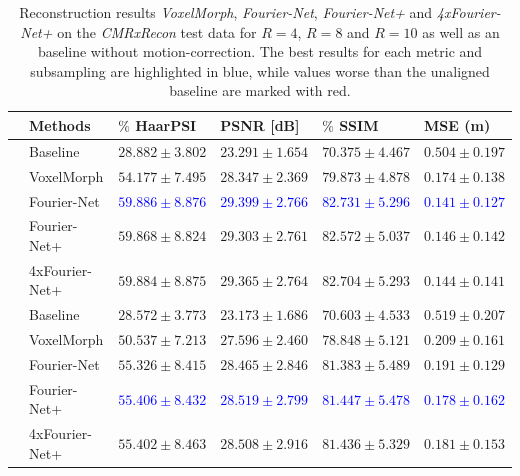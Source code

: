 \begin{table}[H] %
	\small
	\centering
	\caption{Reconstruction results \emph{VoxelMorph}, \emph{Fourier-Net}, \emph{Fourier-Net+} and \emph{4xFourier-Net+} on the \emph{CMRxRecon} test data for $R=4$, $R=8$ and $R=10$ as well as an baseline without motion-correction. The best results for each metric and subsampling are highlighted in blue, while values worse than the unaligned baseline are marked with red.}
	\label{tab:ComparisonReconstructionCMRxReconLungMovement}
	\begin{tabularx}{\textwidth}{c Y Y Y Y Y} 
		\toprule
		 & Methods & $\%$ HaarPSI & PSNR [dB] & $\%$ SSIM & MSE (m)\\
		
		\midrule
		 & Baseline & $28.882 \pm 3.802$ & $23.291 \pm 1.654$ & $70.375 \pm 4.467$ & $0.504 \pm 0.197$ \\  
		 & VoxelMorph & $54.177 \pm 7.495$ & $28.347 \pm 2.369$ & $79.873 \pm 4.878$ & $0.174 \pm 0.138$ \\ 
		 & Fourier-Net & \textcolor{blue}{$59.886 \pm 8.876$} & \textcolor{blue}{$29.399 \pm 2.766$} & \textcolor{blue}{$82.731 \pm 5.296$} & \textcolor{blue}{$0.141 \pm 0.127$} \\  
		 & Fourier-Net+ & $59.868 \pm 8.824$ & $29.303 \pm 2.761$ & $82.572 \pm 5.037$ & $0.146 \pm 0.142$  \\    
		 & \mbox{4xFourier-Net+} & $59.884 \pm 8.875$ & $29.365 \pm 2.764$ & $82.704 \pm 5.293$ & $0.144 \pm 0.141$ \\ 
		
		\midrule
		 & Baseline & $28.572 \pm 3.773$ & $23.173 \pm 1.686$ & $70.603 \pm 4.533$ & $0.519 \pm 0.207$ \\  
		 & VoxelMorph & $50.537 \pm 7.213$ & $27.596 \pm 2.460$ & $78.848 \pm 5.121$ & $0.209 \pm 0.161$ \\ 
		 & Fourier-Net & $55.326 \pm 8.415$ & $28.465 \pm 2.846$ & $81.383 \pm 5.489$ & $0.191 \pm 0.129$ \\  
		 & Fourier-Net+ & \textcolor{blue}{$55.406 \pm 8.432$} & \textcolor{blue}{$28.519 \pm 2.799$} & \textcolor{blue}{$81.447 \pm 5.478$} & \textcolor{blue}{$0.178 \pm 0.162$} \\    
		 & \mbox{4xFourier-Net+} & $55.402 \pm 8.463$ & $28.508 \pm 2.916$ & $81.436 \pm 5.329$ & $0.181 \pm 0.153$ \\ 
		 	 

\end{tabularx}
\end{table}

